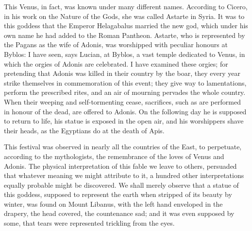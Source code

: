 \documentclass[a4paper, 11pt, oneside, polutonikogreek, english]{article}
\begin{document}
This Venus, in fact, was known under many different names. According to Cicero, in his work on the Nature of the Gods, she was called Astarte in Syria. It was to this goddess that the Emperor Helagabalus married the new god, which under his own name he had added to the Roman Pantheon. Astarte, who is represented by the Pagans as the wife of Adonis, was worshipped with peculiar honours at Byblos: I have seen, says Lucian, at Byblos, a vast temple dedicated to Venus, in which the orgies of Adonis are celebrated. I have examined these orgies; for pretending that Adonis was killed in their country by the boar, they every year strike themselves in commemoration of this event; they give way to lamentations, perform the prescribed rites, and an air of mourning pervades the whole country. When their weeping and self-tormenting cease, sacrifices, such as are performed in honour of the dead, are offered to Adonis. On the following day he is supposed to return to life, his statue is exposed in the open air, and his worshippers shave their heads, as the Egyptians do at the death of Apis.

This festival was observed in nearly all the countries of the East, to perpetuate, according to the mythologists, the remembrance of the loves of Venus and Adonis. The physical interpretation of this fable we leave to others, persuaded that whatever meaning we might attribute to it, a hundred other interpretations equally probable might be discovered. We shall merely observe that a statue of this goddess, supposed to represent the earth when stripped of its beauty by winter, was found on Mount Libanus, with the left hand enveloped in the drapery, the head covered, the countenance sad; and it was even supposed by some, that tears were represented trickling from the eyes.
\end{document}
